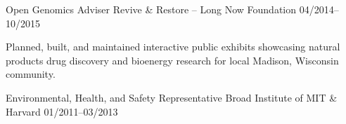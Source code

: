 \begin{cventries}
  \cventry
    {Open Genomics Adviser} %
    {Revive \& Restore -- Long Now Foundation} %
    {} %
    {04/2014--10/2015} %
    {
      \begin{cvitems} %
        \item {Planned, built, and maintained interactive public exhibits showcasing natural products drug discovery and bioenergy research for local Madison, Wisconsin community.}
      \end{cvitems}
    }

  \cventry
    {Environmental, Health, and Safety Representative} %
    {Broad Institute of MIT \& Harvard} %
    {} %
    {01/2011--03/2013} %
    {}   
    
\end{cventries}